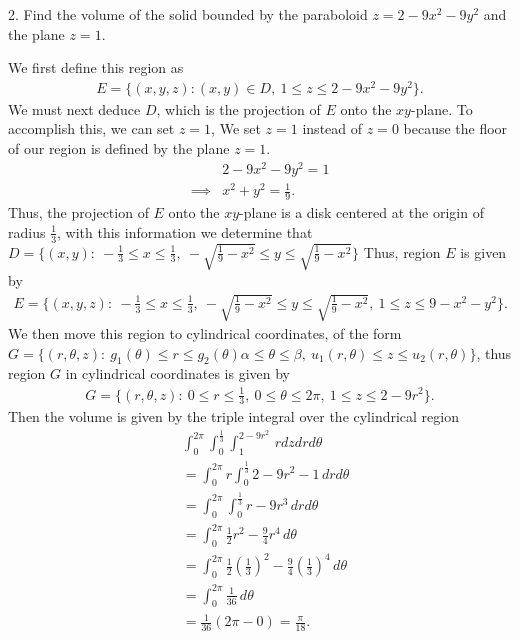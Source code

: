 \documentclass{report}
\begin{document}
    \bigbreak \noindent 
    \begin{mdframed}
        2. Find the volume of the solid bounded by the paraboloid $z=2-9x^{2} -9y^{2}$ and the plane $z = 1$.
    \end{mdframed}
    \bigbreak \noindent 
    We first define this region as 
    \begin{align*}
        E = \{(x,y,z): (x,y) \in D,\ 1 \leq z \leq 2-9x^{2}-9y^{2}\}
    .\end{align*}
    \bigbreak \noindent 
    We must next deduce $D$, which is the projection of $E$ onto the $xy$-plane. To accomplish this, we can set $z=1$, We set $z=1$ instead of $z=0$ because the floor of our region is defined by the plane $z=1$.
    \begin{align*}
        &2-9x^{2} -9y^{2} = 1 \\
        \implies &x^{2} + y^{2} = \frac{1}{9} 
    .\end{align*}
    Thus, the projection of $E$ onto the $xy$-plane is a disk centered at the origin of radius $\frac{1}{3}$, with this information we determine that $D=\{(x,y):\ -\frac{1}{3} \leq x \leq \frac{1}{3},\ - \sqrt{\frac{1}{9}-x^{2}} \leq y \leq \sqrt{\frac{1}{9}-x^{2}}\} $
    \bigbreak \noindent 
    Thus, region $E$ is given by
    \begin{align*}
        E = \{(x,y,z):\ -\frac{1}{3} \leq x \leq \frac{1}{3},\ - \sqrt{\frac{1}{9}-x^{2}} \leq y \leq \sqrt{\frac{1}{9}-x^{2}},\ 1 \leq z \leq 9-x^{2}-y^{2}\}
    .\end{align*}
    \bigbreak \noindent 
    We then move this region to cylindrical coordinates, of the form $G = \{(r,\theta ,z):\ g_{1}(\theta ) \leq r \leq g_{2}(\theta ) \alpha \leq \theta  \leq \beta,\ u_{1}(r,\theta ) \leq z \leq u_{2}(r,\theta )\} $, thus region $G$ in cylindrical coordinates is given by 
    \begin{align*}
        G = \{(r,\theta,z):\ 0 \leq r \leq \frac{1}{3},\ 0 \leq \theta  \leq 2\pi,\ 1 \leq z \leq 2-9r^{2}\}
    .\end{align*}
    \bigbreak \noindent 
    Then the volume is given by the triple integral over the cylindrical region
    \begin{align*}
        &\int_{0}^{2\pi }\int_{0}^{\frac{1}{3}}\int_{1}^{2-9r^{2}}\, rdzdrd\theta \\
        &=\int_{0}^{2\pi }r\int_{0}^{\frac{1}{3}}2-9r^{2} - 1  \, drd\theta  \\
        &=\int_{0}^{2\pi}\int_{0}^{\frac{1}{3}}r-9r^{3}  \, drd\theta  \\
        &=\int_{0}^{2\pi} \frac{1}{2}r^{2}-\frac{9}{4}r^{4} \, d\theta  \\
        &=\int_{0}^{2\pi}  \frac{1}{2}\left(\frac{1}{3}\right)^{2}-\frac{9}{4}\left(\frac{1}{3}\right)^{4}\, d\theta \\
        &=\int_{0}^{2\pi}  \frac{1}{36}\, d\theta  \\
        &=\frac{1}{36}(2\pi-0) = \frac{\pi}{18}
    .\end{align*}
\end{document}
